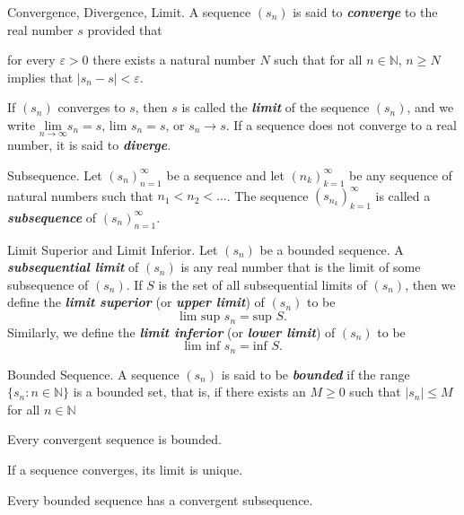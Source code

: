 \documentclass[12pt]{article}
\newcommand\abs[1]{\left|#1\right|}
\newcommand\Natural{\mathbb{N}}
\begin{document}
\begin{definition}{Convergence, Divergence, Limit.}
  A sequence $(s_n)$ is said to \textbf{\textit{converge}} to the real number
  $s$ provided that
  \begin{center}
    for every $\varepsilon > 0$ there exists a natural number $N$ such that for
    all $n \in \Natural$, $n \ge N$ implies that $\abs{s_n - s} < \varepsilon$.
  \end{center}
  If $(s_n)$ converges to $s$, then $s$ is called the \textbf{\textit{limit}}
  of the sequence $(s_n)$, and we write $\underset{n\rightarrow\infty}{\text{lim}} s_n = s$,
  lim $s_n = s$, or $s_n \rightarrow s$. If a sequence does not converge to a real
  number, it is said to \textbf{\textit{diverge}}.
\end{definition}

\begin{definition}{Subsequence.}
Let $(s_n)_{n=1}^\infty$ be a sequence and let $(n_k)_{k=1}^{\infty}$ be any sequence
of natural numbers such that $n_1 < n_2 < ...$. The sequence
$(s_{n_k})_{k=1}^{\infty}$ is called a \textit{\textbf{subsequence}} of
$(s_n)_{n=1}^\infty$.
\end{definition}

\begin{definition}{Limit Superior and Limit Inferior.}
  Let $(s_n)$ be a bounded sequence. A \textbf{\textit{subsequential limit}}
  of $(s_n)$ is any real number that is the limit of some subsequence of
  $(s_n)$. If $S$ is the set of all subsequential limits of $(s_n)$, then we
  define the \textbf{\textit{limit superior}} (or \textbf{\textit{upper
  limit}}) of $(s_n)$ to be $$\text{lim sup } s_n = \text{sup } S.$$
  Similarly, we define the \textit{\textbf{limit inferior}} (or
  \textit{\textbf{lower limit}}) of $(s_n)$ to be $$\text{lim inf } s_n =
  \text{inf } S.$$
\end{definition}

\begin{definition}{Bounded Sequence.}
  A sequence $(s_n)$ is said to be \textit{\textbf{bounded}} if the range $\{
  s_n : n \in \Natural \}$ is a bounded set, that is, if there exists an $M \ge
  0$ such that $\abs{s_n} \le M$ for all $n \in \Natural$

  Every convergent sequence is bounded.

  If a sequence converges, its limit is unique.

  Every bounded sequence has a convergent subsequence.
\end{definition}
\end{document}

